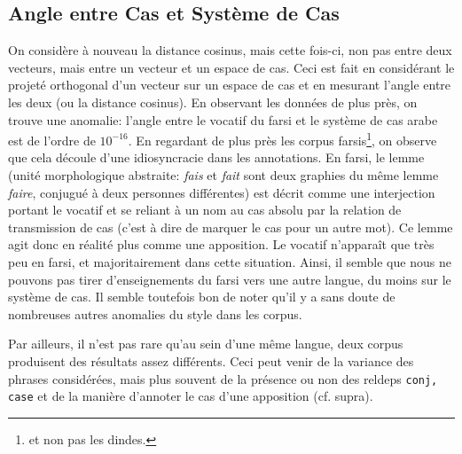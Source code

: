 \documentclass{cours}
\begin{document}
    \subsection{Angle entre Cas et Système de Cas}
    On considère à nouveau la distance cosinus, mais cette fois-ci, non pas entre deux vecteurs, mais entre un vecteur et un espace de cas.
    Ceci est fait en considérant le projeté orthogonal d'un vecteur sur un espace de cas et en mesurant l'angle entre les deux (ou la distance cosinus).
    En observant les données de plus près, on trouve une anomalie: l'angle entre le vocatif du farsi et le système de cas arabe est de l'ordre de $10^{-16}$.
    En regardant de plus près les corpus farsis\footnote{et non pas les dindes.}, on observe que cela découle d'une idiosyncracie dans les annotations.
    En farsi, le lemme (unité morphologique abstraite: \textsl{fais} et \textsl{fait} sont deux graphies du même lemme \textsl{faire}, conjugué à deux personnes différentes)
    est décrit comme une interjection portant le vocatif et se reliant à un nom au cas absolu par la relation de transmission de cas (c'est à dire de marquer le cas pour un autre mot).
    Ce lemme agit donc en réalité plus comme une apposition.
    Le vocatif n'apparaît que très peu en farsi, et majoritairement dans cette situation.
    Ainsi, il semble que nous ne pouvons pas tirer d'enseignements du farsi vers une autre langue, du moins sur le système de cas.
    Il semble toutefois bon de noter qu'il y a sans doute de nombreuses autres anomalies du style dans les corpus.

    Par ailleurs, il n'est pas rare qu'au sein d'une même langue, deux corpus produisent des résultats assez différents. Ceci peut venir de la variance des phrases considérées, mais plus souvent de la présence ou non des reldeps \texttt{conj, case} et de la manière d'annoter le cas d'une apposition (cf. supra).
\end{document}
